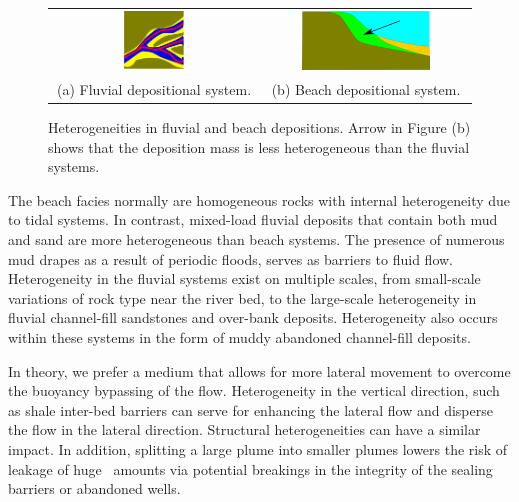 \begin{figure}
\begin{tabular}{cc}
\includegraphics[width=0.3\textwidth]{./figurer/delta_fluvial}&
\includegraphics[width=0.65\textwidth]{./figurer/delta_beach}\\(a) Fluvial depositional system. &(b) Beach depositional system.
\end{tabular}
\caption{Heterogeneities in fluvial and beach depositions. Arrow in Figure (b) shows that the deposition mass is less heterogeneous than the fluvial systems.}
\label{fig:delta}
\end{figure}

The beach facies normally are homogeneous rocks with internal heterogeneity due to tidal systems. In contrast, mixed-load fluvial deposits that contain both mud and sand are more heterogeneous than beach systems. The presence of numerous mud drapes as a result of periodic floods, serves as barriers to fluid flow. Heterogeneity in the fluvial systems exist on multiple scales, from small-scale variations of rock type near the river bed, to the large-scale heterogeneity in fluvial channel-fill sandstones and over-bank deposits. Heterogeneity also occurs within these systems in the form of muddy abandoned channel-fill deposits.

In theory, we prefer a medium that allows for more lateral movement to overcome the buoyancy bypassing of the flow. Heterogeneity in the vertical direction, such as shale inter-bed barriers can serve for enhancing the lateral flow and disperse the flow in the lateral direction. Structural heterogeneities can have a similar impact. In addition, splitting a large plume into smaller plumes lowers the risk of leakage of huge \coo\ amounts via potential breakings in the integrity of the sealing barriers or abandoned wells.

